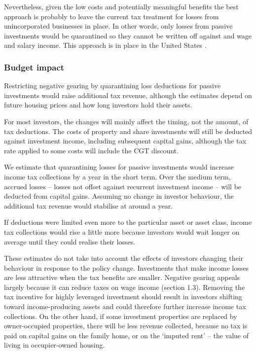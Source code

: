\documentclass{grattan}\usepackage[]{graphicx}\usepackage[]{color}
\begin{document}
Nevertheless, given the low costs and potentially meaningful benefits the best approach is probably to leave the current tax treatment for losses from unincorporated businesses in place. In other words, only losses from passive investments would be quarantined so they cannot be written off against and wage and salary income. This approach is in place in the United States . 

\subsubsection{Budget impact}
Restricting negative gearing by quarantining loss deductions for passive investments would raise additional tax revenue, although the estimates depend on future housing prices and how long investors hold their assets. 

For most investors, the changes will mainly affect the timing, not the amount, of tax deductions. The costs of property and share investments will still be deducted against investment income, including subsequent capital gains, although the tax rate applied to some costs will include the CGT discount. 



We estimate that quarantining losses for passive investments would increase income tax collections by  a year in the short term. Over the medium term, accrued losses -- losses not offset against recurrent investment income -- will be deducted from capital gains. Assuming no change in investor behaviour, the additional tax revenue would stabilise at around  a year.

If deductions were limited even more to the particular asset or asset class, income tax collections would rise a little more because investors would wait longer on average until they could realise their losses. 

These estimates do not take into account the effects of investors changing their behaviour in response to the policy change. Investments that make income losses are less attractive when the tax benefits are smaller. Negative gearing appeals largely because it can reduce taxes on wage income (section 1.3). Removing the tax incentive for highly leveraged investment should result in investors shifting toward income-producing assets and could therefore further increase income tax collections. On the other hand, if some investment properties are replaced by owner-occupied properties, there will be less revenue collected, because no tax is paid on capital gains on the family home, or on the `imputed rent' -- the value of living in occupier-owned housing.
\end{document}
